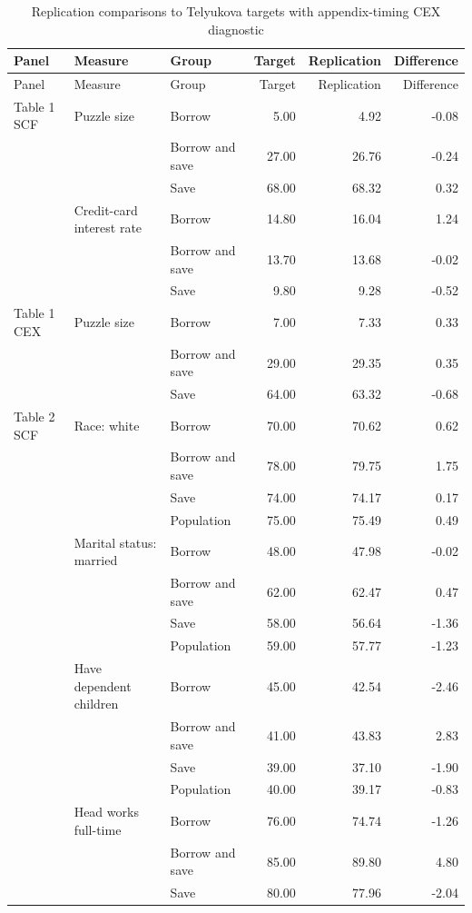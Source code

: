 \begin{longtable}{lllrrr}
\caption{Replication comparisons to Telyukova targets with appendix-timing CEX diagnostic}\label{tab:replication-comparison-appendix-cex}\\
\toprule
Panel & Measure & Group & Target & Replication & Difference \\
\midrule
\endfirsthead
\toprule
Panel & Measure & Group & Target & Replication & Difference \\
\midrule
\endhead
Table 1 SCF & Puzzle size & Borrow & 5.00 & 4.92 & -0.08 \\
 &  & Borrow and save & 27.00 & 26.76 & -0.24 \\
 &  & Save & 68.00 & 68.32 & 0.32 \\
 & Credit-card interest rate & Borrow & 14.80 & 16.04 & 1.24 \\
 &  & Borrow and save & 13.70 & 13.68 & -0.02 \\
 &  & Save & 9.80 & 9.28 & -0.52 \\
Table 1 CEX & Puzzle size & Borrow & 7.00 & 7.33 & 0.33 \\
 &  & Borrow and save & 29.00 & 29.35 & 0.35 \\
 &  & Save & 64.00 & 63.32 & -0.68 \\
Table 2 SCF & Race: white & Borrow & 70.00 & 70.62 & 0.62 \\
 &  & Borrow and save & 78.00 & 79.75 & 1.75 \\
 &  & Save & 74.00 & 74.17 & 0.17 \\
 &  & Population & 75.00 & 75.49 & 0.49 \\
 & Marital status: married & Borrow & 48.00 & 47.98 & -0.02 \\
 &  & Borrow and save & 62.00 & 62.47 & 0.47 \\
 &  & Save & 58.00 & 56.64 & -1.36 \\
 &  & Population & 59.00 & 57.77 & -1.23 \\
 & Have dependent children & Borrow & 45.00 & 42.54 & -2.46 \\
 &  & Borrow and save & 41.00 & 43.83 & 2.83 \\
 &  & Save & 39.00 & 37.10 & -1.90 \\
 &  & Population & 40.00 & 39.17 & -0.83 \\
 & Head works full-time & Borrow & 76.00 & 74.74 & -1.26 \\
 &  & Borrow and save & 85.00 & 89.80 & 4.80 \\
 &  & Save & 80.00 & 77.96 & -2.04 \\

\end{longtable}
